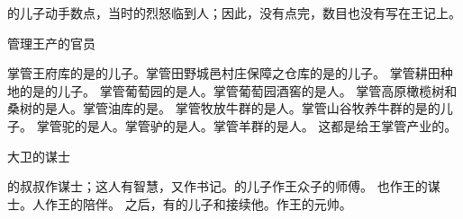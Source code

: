 {的儿子{}动手数点，当时{}的烈怒临到{}人；因此，没有点完，数目也没有写在{}王记上。
\par }{\SH 管理王产的官员
\par }{\PP {}掌管王府库的是{}的儿子{}。掌管田野城邑村庄保障之仓库的是{}的儿子{}。
掌管耕田种地的是{}的儿子{}。
掌管葡萄园的是{}人{}。掌管葡萄园酒窖的是{}人{}。
掌管高原橄榄树和桑树的是{}人{}。掌管油库的是{}。
掌管{}牧放牛群的是{}人{}。掌管山谷牧养牛群的是{}的儿子{}。
掌管驼{}的是{}人{}。掌管驴{}的是{}人{}。掌管羊群的是{}人{}。
这都是给{}王掌管产业的。
\par }{\SH 大卫的谋士
\par }{\PP {}的叔叔{}作谋士；这人有智慧，又作书记。{}的儿子{}作王众子的师傅。
也作王的谋士。{}人{}作王的陪伴。
之后，有{}的儿子{}和{}接续他{}。{}作王的元帅。

}
